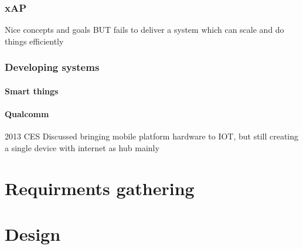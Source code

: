 \documentclass{l4proj}
\begin{document}
\subsection{xAP} %
\label{sub:xap}
\cite{xAP}
Nice concepts and goals
BUT fails to deliver a system which can scale and do things efficiently


\subsection{Developing systems} %
\label{sub:developing_systems}

\subsubsection{Smart things} %
\label{ssub:smart_things}


\subsubsection{Qualcomm} %
\label{ssub:qualcomm}
2013 CES Discussed bringing mobile platform hardware to IOT, but still creating a single device with internet as hub mainly 






\chapter{Requirments gathering} %
\label{cha:requirments_gathering}






\chapter{Design} %
\label{cha:design}
\end{document}
